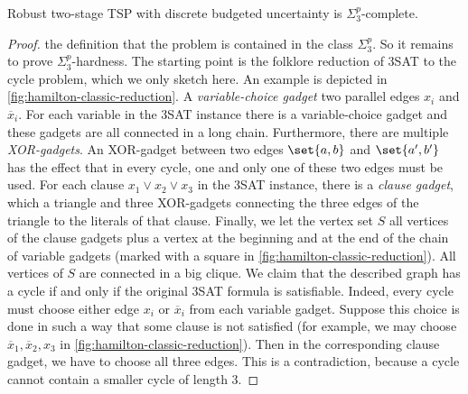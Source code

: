 \documentclass[a4paper,abstracton]{scrartcl}
\begin{document}
\begin{theorem}
\label{thm:discr-two-stage-tsp}
Robust two-stage TSP with discrete budgeted uncertainty is $\Sigma_3^p$-complete.
\end{theorem}
\begin{proof}
 the definition that the problem is contained in the class $\Sigma_3^p$. So it remains to prove $\Sigma_3^p$-hardness.
The starting point is the folklore reduction of 3SAT to the  cycle problem, which we only sketch here. An example is depicted in \cref{fig:hamilton-classic-reduction}.
A \emph{variable-choice gadget}  two parallel edges $x_i$ and $\overline x_i$.
For each variable in the 3SAT instance there is a variable-choice gadget and these gadgets are all connected in a long chain. 
Furthermore, there are multiple \emph{XOR-gadgets}. An XOR-gadget between two edges $\set{a,b}$ and $\set{a',b'}$ has the effect that in every  cycle, one and only one of these two edges must be used.
For each clause $x_1 \lor x_2 \lor x_3$ in the 3SAT instance, there is a \emph{clause gadget}, which  a triangle and three XOR-gadgets connecting the three edges of the triangle to the literals of that clause.
Finally, we let the vertex set $S$  all vertices of the clause gadgets plus a vertex at the beginning and at the end of the chain of variable gadgets (marked with a square in \cref{fig:hamilton-classic-reduction}).
All vertices of $S$ are connected in a big clique.
We claim that the described graph has a  cycle if and only if the original 3SAT formula is satisfiable. Indeed, every  cycle must choose either edge $x_i$ or $\overline x_i$ from each variable gadget.
Suppose this choice is done in such a way that some clause is not satisfied (for example, we may choose $\overline x_1, \overline{x}_2, x_3$ in \cref{fig:hamilton-classic-reduction}). 
Then in the corresponding clause gadget, we have to choose all three edges. This is a contradiction, because a  cycle cannot contain a smaller cycle of length 3.
 

\end{proof}
\end{document}
